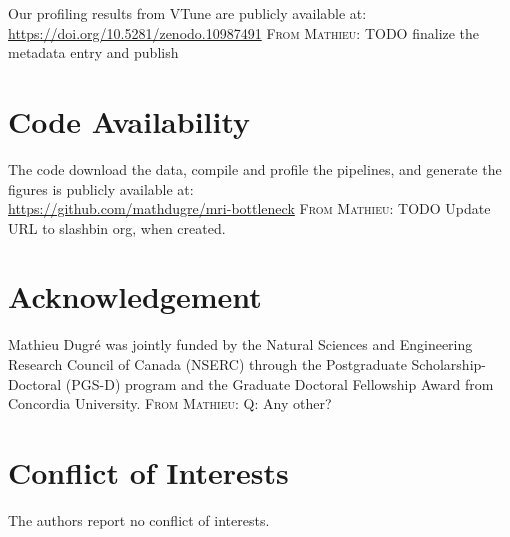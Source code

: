 \documentclass[conference]{IEEEtran}
\newcommand{\MD}[1]{\color{magenta}\textsc{From Mathieu: }#1\color{black}}
\begin{document}
Our profiling results from VTune are publicly available at:
\\\href{https://doi.org/10.5281/zenodo.10987491}{https://doi.org/10.5281/zenodo.10987491}
\MD{TODO finalize the metadata entry and publish}

\section{Code Availability}
\label{sec:code-availability}
The code download the data, compile and profile the pipelines, and generate the figures is publicly available at:
\\\href{https://github.com/mathdugre/mri-bottleneck}{https://github.com/mathdugre/mri-bottleneck}
\MD{TODO Update URL to slashbin org, when created.}
													
\section*{Acknowledgement}
Mathieu Dugr\'e was jointly funded by the Natural Sciences and Engineering Research Council of Canada (NSERC) through the Postgraduate Scholarship-Doctoral (PGS-D) program and the Graduate Doctoral Fellowship Award from Concordia University.
\MD{Q: Any other?}
													
\section*{Conflict of Interests}
The authors report no conflict of interests.
													

% 

													
\newpage
\onecolumn
\end{document}
